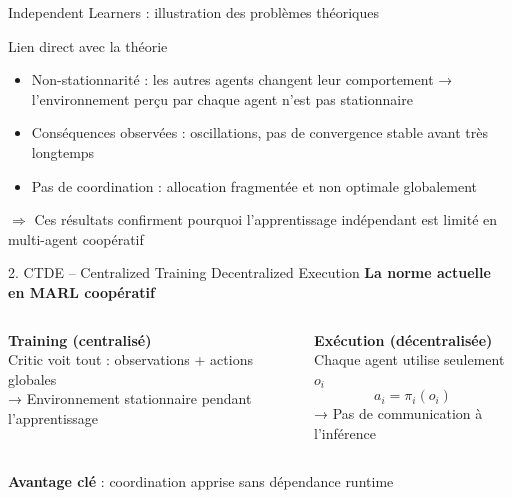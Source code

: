 \documentclass{beamer}
\begin{document}
\begin{frame}{Independent Learners : illustration des problèmes théoriques}

\begin{alertblock}{Lien direct avec la théorie}
\begin{itemize}
    \item \alert{Non-stationnarité} : les autres agents changent leur comportement → l'environnement perçu par chaque agent n'est pas stationnaire
    \item Conséquences observées : oscillations, pas de convergence stable avant très longtemps
    \item Pas de coordination : allocation fragmentée et non optimale globalement
\end{itemize}
\end{alertblock}

\smallskip\centering
$\Rightarrow$ Ces résultats confirment pourquoi l'apprentissage indépendant est limité en multi-agent coopératif
\end{frame}

\begin{frame}{2. CTDE – Centralized Training Decentralized Execution}
\centering
\Large\textbf{La norme actuelle en MARL coopératif}

 \vspace{0.8em}

\begin{columns}[T]
    \textbf{Training (centralisé)} \\
    Critic voit \alert{tout} : observations + actions globales \\
    → Environnement stationnaire pendant l’apprentissage

    \textbf{Exécution (décentralisée)} \\
    Chaque agent utilise seulement $o_i$ \\
    \[ a_i = \pi_i(o_i) \]
    → Pas de communication à l’inférence
\end{columns}

 \vspace{0.7em}

\textbf{Avantage clé} : coordination apprise sans dépendance runtime
\end{frame}
\end{document}
